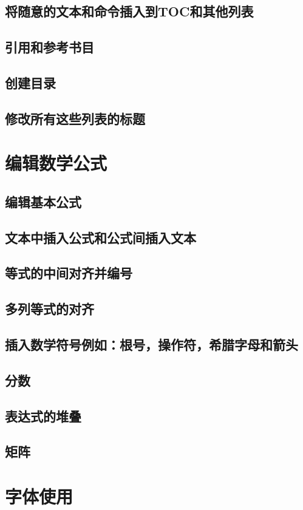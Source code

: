\documentclass{book}
\begin{document}
	\section{将随意的文本和命令插入到TOC和其他列表}
	\section{引用和参考书目}
	\section{创建目录}
	\section{修改所有这些列表的标题}
\chapter{编辑数学公式}
	\section{编辑基本公式}
	\section{文本中插入公式和公式间插入文本}
	\section{等式的中间对齐并编号}
	\section{多列等式的对齐}
	\section{插入数学符号例如：根号，操作符，希腊字母和箭头}
	\section{分数}
	\section{表达式的堆叠}
	\section{矩阵}
\chapter{字体使用}
\end{document}

